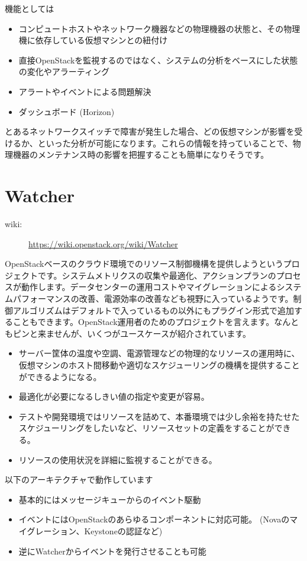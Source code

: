 機能としては

\begin{itemize}
	\item コンピュートホストやネットワーク機器などの物理機器の状態と、その物理機に依存している仮想マシンとの紐付け
	\item 直接OpenStackを監視するのではなく、システムの分析をベースにした状態の変化やアラーティング
	\item アラートやイベントによる問題解決
	\item ダッシュボード (Horizon)
\end{itemize}

とあるネットワークスイッチで障害が発生した場合、どの仮想マシンが影響を受けるか、といった分析が可能になります。これらの情報を持っていることで、物理機器のメンテナンス時の影響を把握することも簡単になりそうです。

\section{Watcher}
\begin{description}
	\item[wiki:] \url{https://wiki.openstack.org/wiki/Watcher}
\end{description}
OpenStackベースのクラウド環境でのリソース制御機構を提供しようというプロジェクトです。システムメトリクスの収集や最適化、アクションプランのプロセスが動作します。データセンターの運用コストやマイグレーションによるシステムパフォーマンスの改善、電源効率の改善なども視野に入っているようです。制御アルゴリズムはデフォルトで入っているもの以外にもプラグイン形式で追加することもできます。OpenStack運用者のためのプロジェクトを言えます。なんともピンと来ませんが、いくつがユースケースが紹介されています。

\begin{itemize}
	\item サーバー筐体の温度や空調、電源管理などの物理的なリソースの運用時に、仮想マシンのホスト間移動や適切なスケジューリングの機構を提供することができるようになる。
	\item 最適化が必要になるしきい値の指定や変更が容易。
	\item テストや開発環境ではリソースを詰めて、本番環境では少し余裕を持たせたスケジューリングをしたいなど、リソースセットの定義をすることができる。
	\item リソースの使用状況を詳細に監視することができる。
\end{itemize}

以下のアーキテクチャで動作しています

\begin{itemize}
	\item 基本的にはメッセージキューからのイベント駆動
	\item イベントにはOpenStackのあらゆるコンポーネントに対応可能。 (Novaのマイグレーション、Keystoneの認証など)
	\item 逆にWatcherからイベントを発行させることも可能
\end{itemize}
